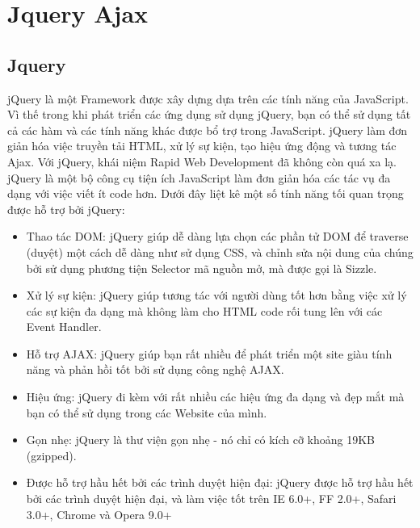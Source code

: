 \section{Jquery Ajax}
\subsection{Jquery}
jQuery là một Framework được xây dựng dựa trên các tính năng của JavaScript. Vì thế trong khi phát triển các ứng dụng sử dụng jQuery, bạn có thể sử dụng tất cả các hàm và các tính năng khác được bổ trợ trong JavaScript. jQuery làm đơn giản hóa việc truyền tải HTML, xử lý sự kiện, tạo hiệu ứng động và tương tác Ajax. Với jQuery, khái niệm Rapid Web Development đã không còn quá xa lạ. jQuery là một bộ công cụ tiện ích JavaScript làm đơn giản hóa các tác vụ đa dạng với việc viết ít code hơn. Dưới đây liệt kê một số tính năng tối quan trọng được hỗ trợ bởi jQuery:
\begin{itemize}
\item Thao tác DOM: jQuery giúp dễ dàng lựa chọn các phần tử DOM để traverse (duyệt) một cách dễ dàng như sử dụng CSS, và chỉnh sửa nội dung của chúng bởi sử dụng phương tiện Selector mã nguồn mở, mà được gọi là Sizzle.
\item Xử lý sự kiện: jQuery giúp tương tác với người dùng tốt hơn bằng việc xử lý các sự kiện đa dạng mà không làm cho HTML code rối tung lên với các Event Handler.
\item Hỗ trợ AJAX: jQuery giúp bạn rất nhiều để phát triển một site giàu tính năng và phản hồi tốt bởi sử dụng công nghệ AJAX.
\item Hiệu ứng: jQuery đi kèm với rất nhiều các hiệu ứng đa dạng và đẹp mắt mà bạn có thể sử dụng trong các Website của mình.
\item Gọn nhẹ: jQuery là thư viện gọn nhẹ - nó chỉ có kích cỡ khoảng 19KB (gzipped).
\item Được hỗ trợ hầu hết bởi các trình duyệt hiện đại: jQuery được hỗ trợ hầu hết bởi các trình duyệt hiện đại, và làm việc tốt trên IE 6.0+, FF 2.0+, Safari 3.0+, Chrome và Opera 9.0+
\end{itemize}


